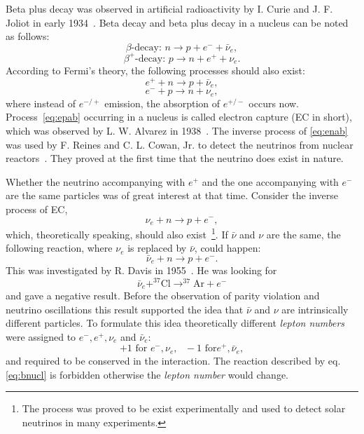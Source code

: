 Beta plus decay was observed in artificial radioactivity by I. Curie and J. F. Joliot in early 1934~\cite{Cur34}. Beta decay and beta plus decay in a nucleus can be noted as follows:
\begin{equation}
  \label{eq:bd}
  \beta\mbox{-decay: } n \rightarrow p+e^{-}+\bar{\nu}_e ,
\end{equation}
\begin{equation}
  \label{eq:bpd}
  \beta^+\mbox{-decay: } p \rightarrow n+e^{+}+\nu_e .
\end{equation}
According to Fermi's theory, the following processes should also exist:
\begin{equation}
  \label{eq:enab}
  e^{+} + n \rightarrow p + \bar{\nu}_e ,
\end{equation}
\begin{equation}
  \label{eq:epab}
  e^{-} + p \rightarrow n + \nu_e ,
\end{equation}
where instead of $e^{-/+}$ emission, the absorption of $e^{+/-}$ occurs now. Process~\ref{eq:epab} occurring in a nucleus is called electron capture (EC in short), which was observed by L. W. Alvarez in 1938~\cite{Alv38}. The inverse process of \ref{eq:enab} was used by F. Reines and C. L. Cowan, Jr. to detect the neutrinos from nuclear reactors~\cite{Cow56, Rei56}. They proved at the first time that the neutrino does exist in nature.

Whether the neutrino accompanying with $e^{+}$ and the one accompanying with $e^{-}$ are the same particles was of great interest at that time. Consider the inverse process of EC,
\begin{equation}
  \label{eq:nunab}
  \nu_e + n \rightarrow p + e^{-} ,
\end{equation}
which, theoretically speaking, should also exist~\footnote{The process was proved to be exist experimentally and used to detect solar neutrinos in many experiments.}. If $\bar{\nu}$ and $\nu$ are the same, the following reaction, where $\nu_e$ is replaced by $\bar{\nu}$, could happen:
\begin{equation}
  \label{eq:bnun}
  \bar{\nu}_e + n \rightarrow p + e^{-}.
\end{equation}
This was investigated by R. Davis in 1955~\cite{Dav55,Dav56}. He was looking for
\begin{equation}
  \label{eq:bnucl}
  \bar{\nu}_e + ^{37}\mbox{Cl} \rightarrow ^{37}\mbox{Ar}+e^{-}
\end{equation}
and gave a negative result. Before the observation of parity violation and neutrino oscillations this result supported the idea that $\bar{\nu}$ and $\nu$ are intrinsically different particles. To formulate this idea theoretically different \emph{lepton numbers} were assigned to $e^{-}, e^{+}, \nu_e$ and $\bar{\nu}_e$:
\begin{equation}
  \label{eq:ln}
  +1 \mbox{ for }e^{-}, \nu_e, \mbox{   }-1 \mbox{ for
}e^{+},\bar{\nu}_e,
\end{equation}
and required to be conserved in the interaction. The reaction described by eq. \ref{eq:bnucl} is forbidden otherwise the \emph{lepton number} would change.


